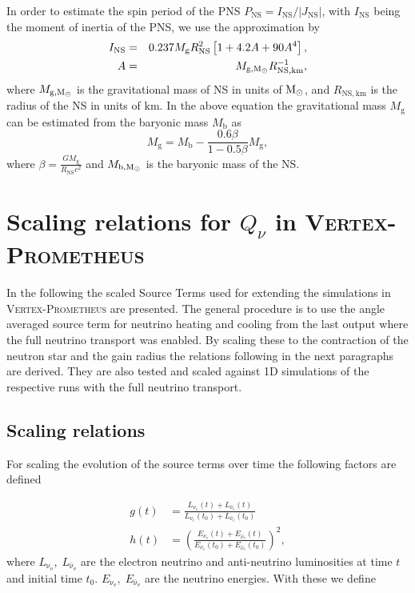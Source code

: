 \documentclass[fleqn,usenatbib]{mnras}
\newcommand{\solm}{\ensuremath{\rm{M_{\odot}}}\xspace}
\newcommand{\km}{\ensuremath{\mathrm{km}}}
\newcommand{\vertexprom}{\textsc{Vertex-Prometheus}\xspace}
\begin{document}
In order to estimate the spin period of the PNS $P_{\mathrm{NS}}=I_{\mathrm{NS}}/|J_{\mathrm{NS}}|$, with $I_{\mathrm{NS}}$ being the moment of inertia of the PNS, we use the approximation by \citet{Lattimer2004}
\begin{eqnarray}
    I_{\mathrm{NS}} &=& 0.237M_{\mathrm{g}}R_{\text{NS}}^2\left[1 + 4.2 A  + 90 A^4\right],\\
    A &=&  M_{\text{g},\solm}R_{\text{NS},\km}^{-1},\nonumber
    \label{equ: ins}
\end{eqnarray}
where $M_{\text{g},\solm}$ is the gravitational mass of NS in units of $\solm$, and $R_{\text{NS},\km}$ is the radius of the NS in units of $\km$.
In the above equation the gravitational mass $M_{\mathrm{g}}$ can be estimated from the baryonic mass $M_{\mathrm{b}}$  as \citep{Lattimer2000}
\begin{equation}
    M_{\mathrm{g}} = M_{\mathrm{b}} - \frac{0.6 \beta}{1-0.5\beta}  M_{\mathrm{g}}, 
\end{equation}
where $\beta=\frac{GM_{\mathrm{g}}}{R_{\mathrm{NS}}c^2}$ and
$M_{\text{b},\solm}$ is the baryonic mass of the NS.

\section{Scaling relations for $Q_{\nu}$ in \vertexprom}
\label{appendix:scaling relations}

In the following the scaled Source Terms used for extending the simulations in \vertexprom are presented. The general procedure is to use the angle averaged source term for neutrino heating and cooling from the last output where the full neutrino transport was enabled. By scaling these to the contraction of the neutron star and the gain radius the relations following in the next paragraphs are derived. They are also tested and scaled against 1D simulations of the respective runs with the full neutrino transport.
\subsection{Scaling relations}
For scaling the evolution of the source terms over time the following factors are defined

\begin{align}
    g(t) &= \frac{L_{\nu_e}(t) +          L_{\bar{\nu}_e}(t)}{L_{\nu_e}(t_0) +
    L_{\bar{\nu}_e}(t_0)} \\
    h(t) &= \left(\frac{E_{\nu_e}(t) + E_{\bar{\nu}_e}(t)}{E_{\nu_e}(t_0) +
    E_{\bar{\nu}_e}(t_0)}\right)^2,
\end{align}
where $L_{\mathrm{\nu_e}}, \;L_{\mathrm{\bar{\nu}_e}}$ are the electron neutrino and anti-neutrino luminosities at time $t$ and initial time $t_0$. $E_{\mathrm{\nu_e}}, \;E_{\mathrm{\bar{\nu}_e}}$ are the neutrino energies. With these we define
\end{document}
